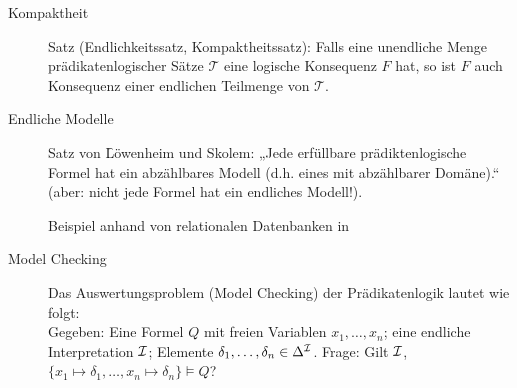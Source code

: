 \begin{description}
        \item[Kompaktheit] Satz (Endlichkeitssatz, Kompaktheitssatz): Falls eine unendliche Menge prädikatenlogischer Sätze $\mathcal{T}$ eine logische Konsequenz $F$ hat, so ist $F$ auch Konsequenz einer endlichen Teilmenge von $\mathcal{T}$.

        \item[Endliche Modelle] Satz von \f{Löwenheim und Skolem}: „Jede erfüllbare prädiktenlogische Formel hat ein abzählbares Modell (d.h. eines mit abzählbarer Domäne).“ (aber: nicht jede Formel hat ein endliches Modell!). 

            Beispiel anhand von relationalen Datenbanken in 

        \item[Model Checking] Das Auswertungsproblem (Model Checking) der Prädikatenlogik lautet wie folgt: \\
            Gegeben: Eine Formel $Q$ mit freien Variablen $x_{1}, \dots, x_{n}$; eine endliche Interpretation $\mathcal{I}$; Elemente $\delta_{1}, \dots, \delta_{n} \in \Delta^{\mathcal{I}}$. Frage: Gilt $\mathcal{I}$, $\{x_{1} \mapsto \delta_{1}, \dots, x_{n} \mapsto \delta_{n} \} \models Q$?

    \end{description}
